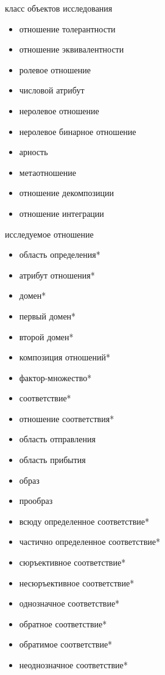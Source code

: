 \begin{SCn}
\begin{scnsubstruct}
\begin{scnhaselementrolelist}{класс объектов исследования}
\begin{itemize}
  \item отношение толерантности
  \item отношение эквивалентности
  \item ролевое отношение
  \item числовой атрибут
  \item неролевое отношение
  \item неролевое бинарное отношение
  \item арность
  \item метаотношение
  \item отношение декомпозиции
  \item отношение интеграции
\end{itemize}
\end{scnhaselementrolelist}
\begin{scnhaselementrolelist}{исследуемое отношение}
\begin{itemize}
  \item область определения*\scnrolesign
  \item атрибут отношения*\scnrolesign
  \item домен*\scnrolesign
  \item первый домен*\scnrolesign
  \item второй домен*\scnrolesign
  \item композиция отношений*\scnrolesign
  \item фактор-множество*\scnrolesign
  \item соответствие*\scnrolesign
  \item отношение соответствия*\scnrolesign
  \item область отправления\scnrolesign
  \item область прибытия\scnrolesign
  \item образ\scnrolesign
  \item прообраз\scnrolesign
  \item всюду определенное соответствие*\scnrolesign
  \item частично определенное соответствие*\scnrolesign
  \item сюръективное соответствие*\scnrolesign
  \item несюръективное соответствие*\scnrolesign
  \item однозначное соответствие*\scnrolesign
  \item обратное соответствие*\scnrolesign
  \item обратимое соответствие*\scnrolesign
  \item неоднозначное соответствие*\scnrolesign

\end{itemize}
\end{scnhaselementrolelist}
\end{scnsubstruct}
\end{SCn}

